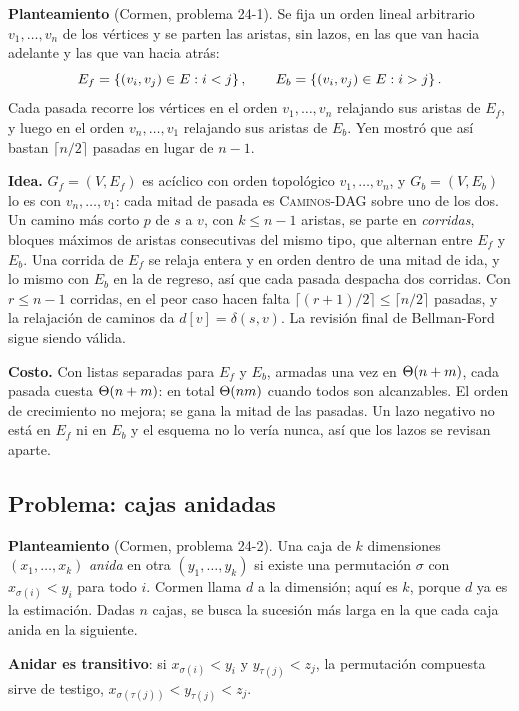 \documentclass[11pt,letterpaper]{article}
\begin{document}
\textbf{Planteamiento} (Cormen, problema 24-1). Se fija un orden
lineal arbitrario $v_1, \dots, v_n$ de los vértices y se parten las
aristas, sin lazos, en las que van hacia adelante y las que van hacia
atrás:
\[
  E_f = \left\{ (v_i, v_j) \in E : i < j \right\} , \qquad
  E_b = \left\{ (v_i, v_j) \in E : i > j \right\} .
\]
Cada pasada recorre los vértices en el orden $v_1, \dots, v_n$
relajando sus aristas de $E_f$, y luego en el orden
$v_n, \dots, v_1$ relajando sus aristas de $E_b$. Yen mostró que así
bastan $\lceil n/2 \rceil$ pasadas en lugar de $n - 1$.

\textbf{Idea.} $G_f = (V, E_f)$ es acíclico con orden topológico
$v_1, \dots, v_n$, y $G_b = (V, E_b)$ lo es con
$v_n, \dots, v_1$: cada mitad de pasada es \textsc{Caminos-DAG} sobre
uno de los dos. Un camino más corto $p$ de $s$ a $v$, con
$k \le n - 1$ aristas, se parte en \emph{corridas}, bloques máximos de
aristas consecutivas del mismo tipo, que alternan entre $E_f$ y
$E_b$. Una corrida de $E_f$ se relaja entera y en orden dentro de una
mitad de ida, y lo mismo con $E_b$ en la de regreso, así que cada
pasada despacha dos corridas. Con $r \le n - 1$ corridas, en el peor
caso hacen falta $\lceil (r + 1)/2 \rceil \le \lceil n/2 \rceil$
pasadas, y la relajación de caminos da $d[v] = \delta(s, v)$. La
revisión final de Bellman-Ford sigue siendo válida.

\textbf{Costo.} Con listas separadas para $E_f$ y $E_b$, armadas una
vez en $\Theta\!\left(n + m\right)$, cada pasada cuesta $\Theta\!\left(n + m\right)$: en total
$\Theta\!\left(nm\right)$ cuando todos son alcanzables. El orden de crecimiento no
mejora; se gana la mitad de las pasadas. Un lazo negativo no está en
$E_f$ ni en $E_b$ y el esquema no lo vería nunca, así que los lazos se
revisan aparte.


\subsection*{Problema: cajas anidadas}

\textbf{Planteamiento} (Cormen, problema 24-2). Una caja de $k$
dimensiones $(x_1, \dots, x_k)$ \emph{anida} en otra
$(y_1, \dots, y_k)$ si existe una permutación $\sigma$ con
$x_{\sigma(i)} < y_i$ para todo $i$. Cormen llama $d$ a la dimensión;
aquí es $k$, porque $d$ ya es la estimación. Dadas $n$ cajas, se busca
la sucesión más larga en la que cada caja anida en la siguiente.

\textbf{Anidar es transitivo}: si $x_{\sigma(i)} < y_i$ y
$y_{\tau(j)} < z_j$, la permutación compuesta sirve de testigo,
$x_{\sigma(\tau(j))} < y_{\tau(j)} < z_j$.
\end{document}
